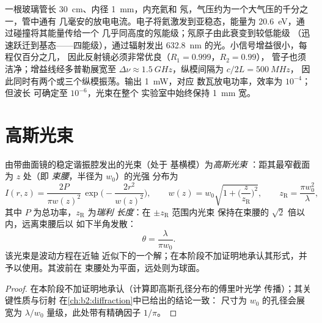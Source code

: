 \begin{example}[氦氖激光器]\label{ex:b2:laser:hene}
一根玻璃管长 \qty{30}{cm}、内径 \qty{1}{mm}，内充氦和
氖，气压约为一个大气压的千分之一，管中通有
几毫安的放电电流。电子将氦激发到亚稳态，能量为
\qty{20.6}{eV}，通过碰撞将其能量传给一个
几乎同高度的氖能级；氖原子由此衰变到较低能级
（迅速跃迁到基态——四能级），通过辐射发出
\qty{632.8}{nm} 的光。小信号增益很小，每程仅百分之几，
因此反射镜必须非常优良（$R_1 = 0.999$，$R_2 = 0.99$），
管子也须洁净；增益线经多普勒展宽至
$\Delta\nu \approx \qty{1.5}{GHz}$，纵模间隔为 $c/2L = \qty{500}{MHz}$，
因此同时有两个或三个纵模振荡。输出 \qty{1}{mW}，对应
数瓦放电功率，效率为 $10^{-4}$；但波长
可确定至 $10^{-6}$，光束在整个
实验室中始终保持 \qty{1}{mm} 宽。
\end{example}

\section{高斯光束}

\begin{proposition}[高斯光束]\label{prop:b2:laser:gaussian}
由带曲面镜的稳定谐振腔发出的光束（处于
基横模）为\emph{高斯光束}
：距其最窄截面为 $z$ 处（即
\emph{束腰}，半径为 $w_0$）的光强
分布为
\[
I(r,z) = \frac{2P}{\pi w(z)^2}\,\exp\Big(-\frac{2r^2}{w(z)^2}\Big),
\qquad
w(z) = w_0\sqrt{1 + \Big(\frac{z}{z_{\text{R}}}\Big)^2},
\qquad
z_{\text{R}} = \frac{\pi w_0^2}{\lambda},
\]
其中 $P$ 为总功率，$z_{\text{R}}$ 为\emph{瑞利
长度}：在 $\pm z_{\text{R}}$ 范围内光束
保持在束腰的 $\sqrt2$ 倍以内，远离束腰后以
如下半角发散：
\[
\theta = \frac{\lambda}{\pi w_0} .
\]
该光束是波动方程在近轴
近似下的一个解；在本阶段不加证明地承认其形式，并予以使用。其波前在
束腰处为平面，远处则为球面。
\end{proposition}

\begin{proof}
在本阶段不加证明地承认（计算即高斯孔径分布的傅里叶光学
传播）；其关键性质与衍射
在\cref{ch:b2:diffraction}中已给出的结论一致：
尺寸为 $w_0$ 的孔径会展宽为 $\lambda/w_0$ 量级，此处带有精确因子
$1/\pi$。
\end{proof}

